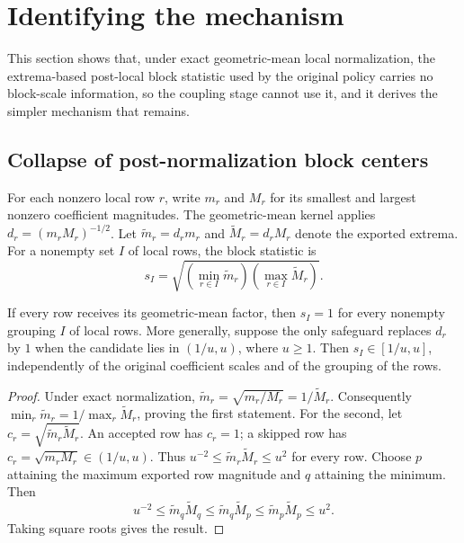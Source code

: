 \section{Identifying the mechanism}
\label{sec:identifiability}

This section shows that, under exact geometric-mean local normalization, the extrema-based
post-local block statistic used by the original policy carries no block-scale information, so
the coupling stage cannot use it, and it derives the simpler mechanism that remains.

\subsection{Collapse of post-normalization block centers}

For each nonzero local row $r$, write $m_r$ and $M_r$ for its smallest and largest
nonzero coefficient magnitudes. The geometric-mean kernel applies
$d_r=(m_rM_r)^{-1/2}$. Let $\widetilde m_r=d_rm_r$ and $\widetilde M_r=d_rM_r$ denote the
exported extrema. For a nonempty set $I$ of local rows, the block statistic is
\[
 s_I=\sqrt{\left(\min_{r\in I}\widetilde m_r\right)
                 \left(\max_{r\in I}\widetilde M_r\right)}.
\]

\begin{proposition}
\label{prop:audit-collapse}
If every row receives its geometric-mean factor, then $s_I=1$ for every nonempty grouping
$I$ of local rows. More generally, suppose the only safeguard replaces $d_r$ by $1$ when the
candidate lies in $(1/u,u)$, where $u\geq1$. Then $s_I\in[1/u,u]$, independently of the
original coefficient scales and of the grouping of the rows.
\end{proposition}
\begin{proof}
Under exact normalization, $\widetilde m_r=\sqrt{m_r/M_r}=1/\widetilde M_r$. Consequently
$\min_r\widetilde m_r=1/\max_r\widetilde M_r$, proving the first statement.
For the second, let $c_r=\sqrt{\widetilde m_r\widetilde M_r}$. An accepted row has
$c_r=1$; a skipped row has $c_r=\sqrt{m_rM_r}\in(1/u,u)$. Thus
$u^{-2}\leq\widetilde m_r\widetilde M_r\leq u^2$ for every row. Choose $p$ attaining
the maximum exported row magnitude and $q$ attaining the minimum. Then
\[
 u^{-2}\leq\widetilde m_q\widetilde M_q
 \leq\widetilde m_q\widetilde M_p
 \leq\widetilde m_p\widetilde M_p\leq u^2.
\]
Taking square roots gives the result.
\end{proof}


